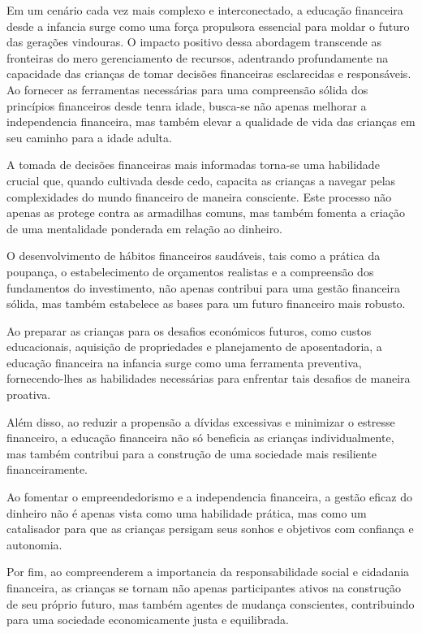 \documentclass{report}
\begin{document}
Em um cenário cada vez mais complexo e interconectado, a educação financeira desde a infancia surge como uma força propulsora essencial para moldar o futuro das gerações vindouras. O impacto positivo dessa abordagem transcende as fronteiras do mero gerenciamento de recursos, adentrando profundamente na capacidade das crianças de tomar decisões financeiras esclarecidas e responsáveis. Ao fornecer as ferramentas necessárias para uma compreensão sólida dos princípios financeiros desde tenra idade, busca-se não apenas melhorar a independencia financeira, mas também elevar a qualidade de vida das crianças em seu caminho para a idade adulta.

A tomada de decisões financeiras mais informadas torna-se uma habilidade crucial que, quando cultivada desde cedo, capacita as crianças a navegar pelas complexidades do mundo financeiro de maneira consciente. Este processo não apenas as protege contra as armadilhas comuns, mas também fomenta a criação de uma mentalidade ponderada em relação ao dinheiro.

O desenvolvimento de hábitos financeiros saudáveis, tais como a prática da poupança, o estabelecimento de orçamentos realistas e a compreensão dos fundamentos do investimento, não apenas contribui para uma gestão financeira sólida, mas também estabelece as bases para um futuro financeiro mais robusto.

Ao preparar as crianças para os desafios económicos futuros, como custos educacionais, aquisição de propriedades e planejamento de aposentadoria, a educação financeira na infancia surge como uma ferramenta preventiva, fornecendo-lhes as habilidades necessárias para enfrentar tais desafios de maneira proativa.

Além disso, ao reduzir a propensão a dívidas excessivas e minimizar o estresse financeiro, a educação financeira não só beneficia as crianças individualmente, mas também contribui para a construção de uma sociedade mais resiliente financeiramente.

Ao fomentar o empreendedorismo e a independencia financeira, a gestão eficaz do dinheiro não é apenas vista como uma habilidade prática, mas como um catalisador para que as crianças persigam seus sonhos e objetivos com confiança e autonomia.

Por fim, ao compreenderem a importancia da responsabilidade social e cidadania financeira, as crianças se tornam não apenas participantes ativos na construção de seu próprio futuro, mas também agentes de mudança conscientes, contribuindo para uma sociedade economicamente justa e equilibrada.
\end{document}
